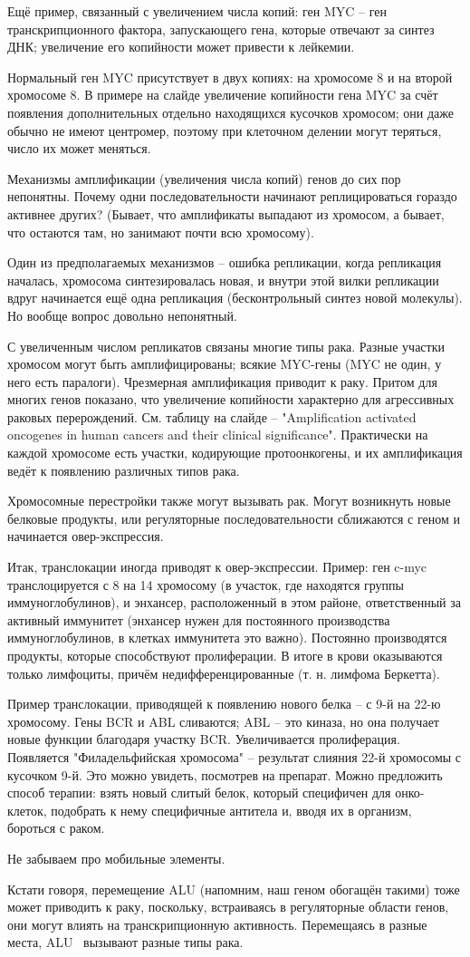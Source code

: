 \documentclass[main.tex]{subfiles}
\begin{document}
Ещё пример, связанный с увеличением числа копий: ген MYC -- ген транскрипционного фактора, запускающего гена, которые отвечают за синтез ДНК; увеличение его копийности может привести к лейкемии.

Нормальный ген MYC присутствует в двух копиях: на хромосоме 8 и на второй хромосоме 8. %
В примере на слайде увеличение копийности гена  MYC за счёт появления дополнительных отдельно находящихся кусочков хромосом; они даже обычно не имеют центромер, поэтому при клеточном делении могут теряться, число их может меняться.

Механизмы амплификации (увеличения числа копий) генов до сих пор непонятны.
Почему одни последовательности начинают реплицироваться гораздо активнее других?
(Бывает, что амплификаты выпадают из хромосом, а бывает, что остаются там, но занимают почти всю хромосому).

Один из предполагаемых механизмов -- ошибка репликации, когда репликация началась, хромосома синтезировалась новая, и внутри этой вилки репликации вдруг начинается ещё одна репликация (бесконтрольный синтез новой молекулы).
Но вообще вопрос довольно непонятный.

С увеличенным числом репликатов связаны многие типы рака.
Разные участки хромосом могут быть амплифицированы; всякие MYC-гены (MYC не один, у него есть паралоги).
Чрезмерная амплификация приводит к раку.
Притом для многих генов показано, что увеличение копийности характерно для агрессивных раковых перерождений.
См. таблицу на слайде -- "Amplification activated oncogenes in human cancers and their clinical significance".
Практически на каждой хромосоме есть участки, кодирующие протоонкогены, и их амплификация ведёт к появлению различных типов рака.

Хромосомные перестройки также могут вызывать рак.
Могут возникнуть новые белковые продукты, или регуляторные последовательности сближаются с геном и начинается овер-экспрессия.

Итак, транслокации иногда приводят к овер-экспрессии.
Пример: ген c-myc транслоцируется с 8 на 14 хромосому (в участок, где находятся группы иммуноглобулинов), и энхансер, расположенный в этом районе, ответственный за активный иммунитет (энхансер нужен для постоянного производства иммуноглобулинов, в клетках иммунитета это важно).
Постоянно производятся продукты, которые способствуют пролиферации.
В итоге в крови оказываются только лимфоциты, причём недифференцированные (т. н. лимфома Беркетта).

Пример транслокации, приводящей к появлению нового белка -- с 9-й на 22-ю хромосому.
Гены BCR и ABL сливаются; ABL -- это киназа, но она получает новые функции благодаря участку BCR.
Увеличивается пролиферация.
Появляется "Филадельфийская хромосома"\hspace{0pt} -- результат слияния 22-й хромосомы с кусочком 9-й.
Это можно увидеть, посмотрев на препарат.
Можно предложить способ терапии: взять новый слитый белок, который специфичен для онко-клеток, подобрать к нему специфичные антитела и, вводя их в организм, бороться с раком.

Не забываем про мобильные элементы.

Кстати говоря, перемещение ALU (напомним, наш геном обогащён такими) тоже может приводить к раку, поскольку, встраиваясь в регуляторные области генов, они могут влиять на транскрипционную активность.
Перемещаясь в разные места, ALU  вызывают разные типы рака.
\end{document}
